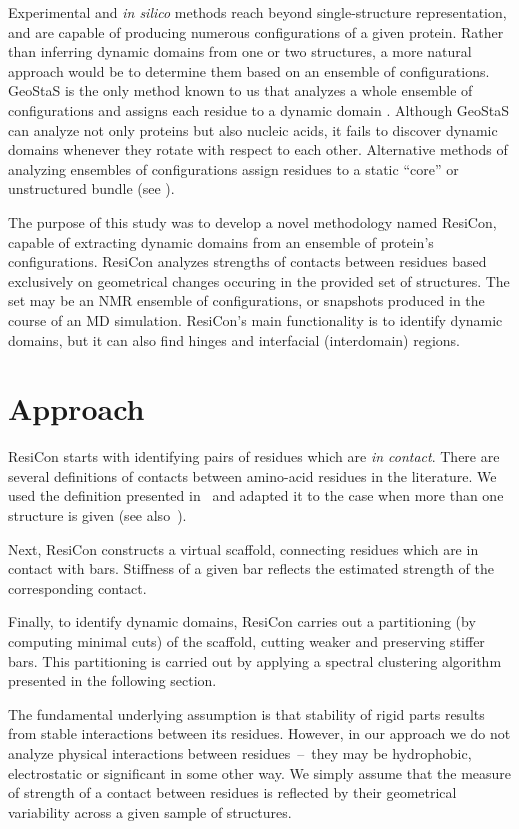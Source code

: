 \documentclass[a4paper,11pt,twoside]{book}%
\begin{document}
Experimental and \emph{in silico} methods reach beyond single-structure representation, and are capable of producing numerous configurations of a given protein.
Rather than inferring dynamic domains from one or two structures, a more natural approach would be to determine them based on an ensemble of configurations.
GeoStaS is the only method known to us that analyzes a whole ensemble of configurations and assigns each residue to a dynamic domain \cite{romanowska2012determining}.
Although GeoStaS can analyze not only proteins but also nucleic acids, it fails to discover dynamic domains whenever they rotate with respect to each other.
Alternative methods of analyzing ensembles of configurations assign residues to a static ``core'' or unstructured bundle (see \cite{snyder2005clustering,kirchner2011objective}).

The purpose of this study was to develop a novel methodology named ResiCon, capable of extracting dynamic domains from an ensemble of protein's configurations.
ResiCon analyzes strengths of contacts between residues based exclusively on geometrical changes occuring in the provided set of structures.
The set may be an NMR ensemble of configurations, or snapshots produced in the course of an MD simulation.
ResiCon's main functionality is to identify dynamic domains, but it can also find hinges and interfacial (interdomain) regions.

\section{Approach} 
ResiCon starts with identifying pairs of residues which are \emph{in contact}.
There are several definitions of contacts between amino-acid residues in the literature.
We used the definition presented in~\cite{daniluk2011novel} and adapted it to the case when more than one structure is given (see also~\cite{daniluk2014theoretical}).

Next, ResiCon constructs a virtual scaffold, connecting residues which are in contact with bars.
Stiffness of a given bar reflects the estimated strength of the corresponding contact. 

Finally, to identify dynamic domains, ResiCon carries out a partitioning (by computing minimal cuts) of the scaffold, cutting weaker and preserving stiffer bars.
This partitioning is carried out by applying a spectral clustering algorithm presented in the following section.

The fundamental underlying assumption is that stability of rigid parts results from stable interactions between its residues.
However, in our approach we do not analyze physical interactions between residues~--~they may be hydrophobic, electrostatic or significant in some other way.
We simply assume that the measure of strength of a contact between residues is reflected by their geometrical variability across a given sample of structures.
\end{document}
